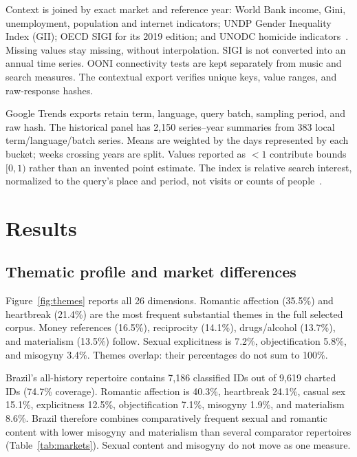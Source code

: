\documentclass[10pt,a4paper,twocolumn]{article}
\begin{document}
Context is joined by exact market and reference year: World Bank income, Gini, unemployment, population and internet indicators; UNDP Gender Inequality Index (GII); OECD SIGI for its 2019 edition; and UNODC homicide indicators~\cite{wdi,gii,sigi,homicide}. Missing values stay missing, without interpolation. SIGI is not converted into an annual time series. OONI connectivity tests are kept separately from music and search measures. The contextual export verifies unique keys, value ranges, and raw-response hashes.

Google Trends exports retain term, language, query batch, sampling period, and raw hash. The historical panel has 2,150 series--year summaries from 383 local term/language/batch series. Means are weighted by the days represented by each bucket; weeks crossing years are split. Values reported as $<1$ contribute bounds $[0,1)$ rather than an invented point estimate. The index is relative search interest, normalized to the query's place and period, not visits or counts of people~\cite{trends}.

\section{Results}
\subsection{Thematic profile and market differences}
Figure~\ref{fig:themes} reports all 26 dimensions. Romantic affection (35.5\%) and heartbreak (21.4\%) are the most frequent substantial themes in the full selected corpus. Money references (16.5\%), reciprocity (14.1\%), drugs/alcohol (13.7\%), and materialism (13.5\%) follow. Sexual explicitness is 7.2\%, objectification 5.8\%, and misogyny 3.4\%. Themes overlap: their percentages do not sum to 100\%.

Brazil's all-history repertoire contains 7,186 classified IDs out of 9,619 charted IDs (74.7\% coverage). Romantic affection is 40.3\%, heartbreak 24.1\%, casual sex 15.1\%, explicitness 12.5\%, objectification 7.1\%, misogyny 1.9\%, and materialism 8.6\%. Brazil therefore combines comparatively frequent sexual and romantic content with lower misogyny and materialism than several comparator repertoires (Table~\ref{tab:markets}). Sexual content and misogyny do not move as one measure.
\end{document}
